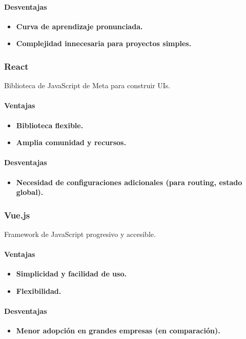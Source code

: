 \paragraph{Desventajas}
\begin{itemize}
    \item \textbf{Curva de aprendizaje pronunciada.}
    \item \textbf{Complejidad innecesaria para proyectos simples.}
\end{itemize}

\subsubsection{React}
Biblioteca de JavaScript de Meta para construir UIs.
\paragraph{Ventajas}
\begin{itemize}
    \item \textbf{Biblioteca flexible.}
    \item \textbf{Amplia comunidad y recursos.}
\end{itemize}
\paragraph{Desventajas}
\begin{itemize}
    \item \textbf{Necesidad de configuraciones adicionales (para routing, estado global).}
\end{itemize}

\subsubsection{Vue.js}
Framework de JavaScript progresivo y accesible.
\paragraph{Ventajas}
\begin{itemize}
    \item \textbf{Simplicidad y facilidad de uso.}
    \item \textbf{Flexibilidad.}
\end{itemize}
\paragraph{Desventajas}
\begin{itemize}
    \item \textbf{Menor adopción en grandes empresas (en comparación).}
\end{itemize}

